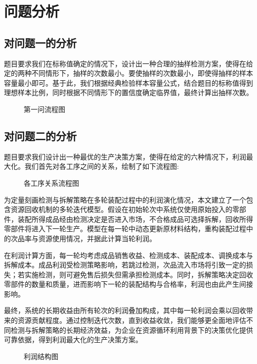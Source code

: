 \documentclass[withoutpreface,bwprint]{cumcmthesis}
\begin{document}
\section{问题分析}
\subsection{对问题一的分析}
题目要求我们在标称值确定的情况下，设计出一种合理的抽样检测方案，使得在给定的两种不同情形下，抽样的次数最小。要使抽样的次数最小，即使得抽样的样本容量最小即可。基于此，我们根据经典检验样本容量公式，结合题目的标称值得到理想样本比例，同时根据不同情形下的置信度确定临界值，最终计算出抽样次数。
\begin{figure}[h]
   \centering
   \resizebox{0.8\linewidth}{!}{}
   \caption{第一问流程图}
   \label{fig:one}
\end{figure}
\subsection{对问题二的分析}
题目要求我们设计出一种最优的生产决策方案，使得在给定的六种情况下，利润最大化。我们首先对各工序之间的关系，绘制了如下流程图:
\begin{figure}[h]
   \centering
   \resizebox{0.9\linewidth}{!}{}
   \caption{各工序关系流程图}
   \label{fig:one}
\end{figure}

为定量刻画检测与拆解策略在多轮装配过程中的利润演化情况，本文建立了一个包含资源回收机制的多轮迭代模型。假设在初始轮次中系统仅使用原始投入的零部件，装配所得成品经由检测决定是否进入市场，不合格成品可选择拆解，回收所得零部件将进入下一轮生产。模型在每一轮中动态更新原材料结构，重构装配过程中的次品率与资源使用情况，并据此计算当轮利润。

在利润计算方面，每一轮均考虑成品销售收益、检测成本、装配成本、调换成本与拆解成本。成品利润受检测策略影响，若跳过检测，次品流入市场将引致一定的损失；若实施检测，则可避免售后损失但需承担检测成本。同时，拆解策略决定回收零部件的数量和质量，进而影响下一轮的装配结构与合格率，利润也由此产生间接影响。

最终，系统的长期收益由所有轮次的利润叠加构成，其中每一轮利润会乘以回收带来的资源贡献程度。通过控制迭代次数，直到收益收敛，我们能够更全面地评估不同检测与拆解策略的长期经济效益，为企业在资源循环利用背景下的决策优化提供可靠依据，得到利润最大化的生产决策方案。
\begin{figure}[h]
   \centering
   \resizebox{0.5\linewidth}{!}{}
   \caption{利润结构图}
   \label{fig:one}
\end{figure}
\end{document}
